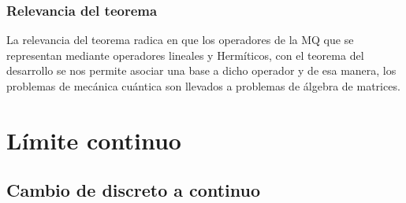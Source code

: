 \documentclass[12pt]{beamer}
\begin{document}
\begin{frame}
\frametitle{Relevancia del teorema}
La relevancia del teorema radica en que los operadores de la MQ que se representan mediante operadores lineales y Hermíticos, \pause con el teorema del desarrollo se nos permite asociar una base a dicho operador y de esa manera, los problemas de mecánica cuántica son llevados a problemas de álgebra de matrices.
\end{frame}

\section{Límite continuo}
\subsection{Cambio de discreto a continuo}
\end{document}
